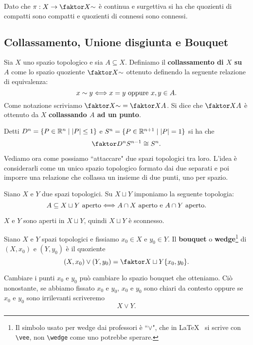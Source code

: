 \begin{multicols*}{2}
\begin{remark}
Dato che $\pi:X\to \quot X\sim$ è continua e surgettiva si ha che quozienti di compatti sono compatti e quozienti di connessi sono connessi.
\end{remark}

\subsection{Collassamento, Unione disgiunta e Bouquet}
\begin{definition}[Collassamento]
Sia $X$ uno spazio topologico e sia $A\subseteq X$. Definiamo il \textbf{collassamento di $X$ su $A$} come lo spazio quoziente $\quot X\sim$ ottenuto definendo la seguente relazione di equivalenza:
\[x\sim y\Longleftrightarrow x=y\text{ oppure }x,y\in A.\]
Come notazione scriviamo $\quot X\sim=\quot XA$. Si dice che $\quot XA$ è ottenuto da $X$ \textbf{collassando $A$ ad un punto}.
\end{definition}

\begin{application}
Detti $D^n=\{P\in \mathbb{R}^n\mid |P|\leq 1\}$ e $S^n=\{P\in\mathbb{R}^{n+1}\mid |P|=1\}$ si ha che
\[\quot{D^n}{S^{n-1}}\cong S^n.\]
\end{application}
\vspace{0.5cm}

\noindent Vediamo ora come possiamo ``attaccare" due spazi topologici tra loro. L'idea \`e considerarli come un unico spazio topologico formato dai due separati e poi imporre una relazione che collassa un insieme di due punti, uno per spazio.

\begin{definition}
Siano $X$ e $Y$ due spazi topologici. Su $X\sqcup Y$ imponiamo la seguente topologia:
\[A\subseteq X\sqcup Y\text{ aperto}\Longleftrightarrow A\cap X\text{ aperto e }A\cap Y\text{ aperto}.\]
\end{definition}
\begin{remark}
$X$ e $Y$ sono aperti in $X\sqcup Y$, quindi $X\sqcup Y$ \`e sconnesso.
\end{remark}

\begin{definition}[Bouquet]
Siano $X$ e $Y$ spazi topologici e fissiamo $x_0\in X$ e $y_0\in Y$. Il \textbf{bouquet} o \textbf{wedge}\footnote{Il simbolo usato per wedge dai professori \`e ``$\vee$", che in \LaTeX~ si scrive con \texttt{\textbackslash vee}, non \texttt{\textbackslash wedge} come uno potrebbe sperare.} di $(X,x_0)$ e $(Y,y_0)$ \`e il quoziente
\[(X,x_0)\vee (Y,y_0)=\quot{X\sqcup Y}{\{x_0,y_0\}}.\]
\end{definition}
\begin{remark}
Cambiare i punti $x_0$ e $y_0$ pu\`o cambiare lo spazio bouquet che otteniamo. Ci\`o nonostante, se abbiamo fissato $x_0$ e $y_0$, $x_0$ e $y_0$ sono chiari da contesto oppure se $x_0$ e $y_0$ sono irrilevanti scriveremo
\[X\vee Y.\]
\end{remark}


\end{multicols*}
